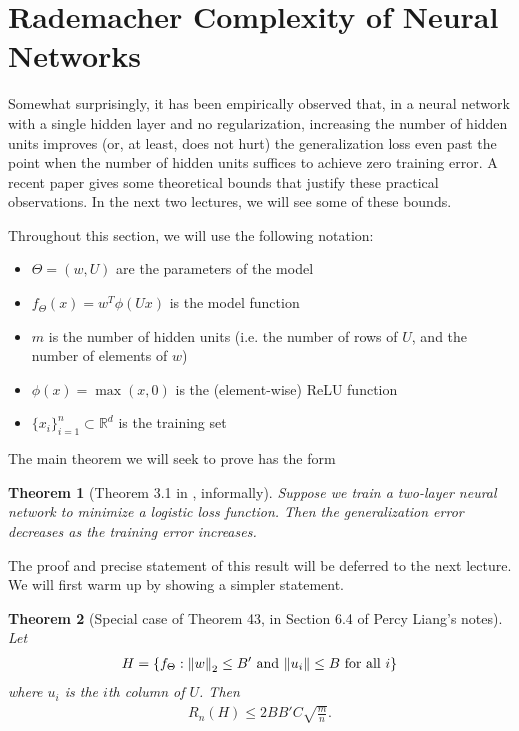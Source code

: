 \documentclass[11pt]{article}
\newcommand\R{\mathbb R}
\newtheorem{theorem}{Theorem}
\begin{document}
\section{Rademacher Complexity of Neural Networks}
Somewhat surprisingly, it has been empirically observed \cite{neyshabur2017exploring} that, in a neural network with a single hidden layer and no regularization, increasing the number of hidden units improves (or, at least, does not hurt) the generalization loss even past the point when the number of hidden units suffices to achieve zero training error. A recent paper \cite{2018arXiv181005369W} gives some theoretical bounds that justify these practical observations. In the next two lectures, we will see some of these bounds. 

Throughout this section, we will use the following notation:
\begin{itemize}
\item $\Theta = (w, U)$ are the parameters of the model
\item $f_\Theta(x) = w^T \phi(Ux)$ is the model function
\item $m$ is the number of hidden units (i.e. the number of rows of $U$, and the number of elements of $w$)
\item $\phi(x) = \max(x, 0)$ is the (element-wise) ReLU function
\item $\{ x_i \}_{i=1}^n \subset \R^d$ is the training set
\end{itemize}\noindent
The main theorem we will seek to prove has the form 
\begin{theorem}[Theorem 3.1 in \cite{2018arXiv181005369W}, informally] Suppose we train a two-layer neural network to minimize a logistic loss function. Then the generalization error decreases as the training error increases.
\end{theorem}\noindent
The proof and precise statement of this result will be deferred to the next lecture. We will first warm up by showing a simpler statement.
\begin{theorem}[Special case of Theorem 43, in Section 6.4 of Percy Liang's notes]
\label{liang-thm} 
Let 
\begin{align}
H = \qty{ f_\Theta : \norm{w}_2 \le B' \text{ and } \norm{u_i} \le B \text{ for all $i$}}
\end{align} where $u_i$ is the $i$th column of $U$. Then 
\begin{align}
R_n(H) \le 2BB'C \sqrt{\frac{m}{n}}.
\end{align}
\end{theorem}
\end{document}
